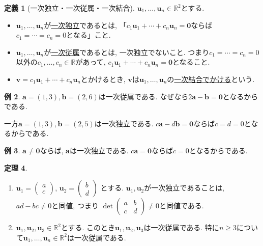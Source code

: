 \documentclass[dvipdfmx,a4paper,11pt]{article}
\newcommand{\R}{\mathbb{R}}
\theoremstyle{definition}
\newtheorem{thm}{定理}
\newtheorem{dfn}[thm]{定義}
\newtheorem{exa}[thm]{例}
\begin{document}
 
\begin{tcolorbox}[
    colback = white,
    colframe = green!35!black,
    fonttitle = \bfseries,
    breakable = true]
    \begin{dfn}[一次独立・一次従属・一次結合]
  $\bm{u}_1, \ldots, \bm{u}_n \in \R^2 $とする. 
    \begin{itemize}
	\setlength{\parskip}{0cm}
  	\setlength{\itemsep}{0pt} 
\item $\bm{u}_1, \ldots, \bm{u}_n $が\underline{一次独立}であるとは, 
「$c_1\bm{u}_1 + \cdots+ c_n\bm{u}_n = \bm{0}$ならば$c_1=\cdots =c_n =0$となる」こと.
\item $\bm{u}_1, \ldots, \bm{u}_n $が\underline{一次従属}であるとは, 
一次独立でないこと. つまり$c_1=\cdots =c_n =0$以外の$c_1, \ldots, c_n \in \R$があって, $c_1\bm{u}_1 + \cdots + c_n\bm{u}_n = \bm{0}$となること.
\item $\bm{v} = c_1\bm{u}_1 + \cdots + c_n\bm{u}_n $とかけるとき, $\bm{v}$は$\bm{u}_1, \ldots, \bm{u}_n$の\underline{一次結合でかける}という.
\end{itemize}
    \end{dfn}
 \end{tcolorbox}

 \begin{exa}
$\bm{a}=(1,3), \bm{b} = (2,6)$は一次従属である.
 なぜなら$2\bm{a} - \bm{b} =\bm{0}$となるからである.
 
 一方$\bm{a}=(1,3), \bm{b} = (2,5)$は一次独立である.
$c\bm{a} - d\bm{b} =\bm{0}$ならば$c=d=0$となるからである. 
\end{exa}

 \begin{exa}
$\bm{a}\neq \bm{0}$ならば, $\bm{a}$は一次独立である.
$c\bm{a} =\bm{0}$ならば$c=0$となるからである. 
\end{exa}


\begin{tcolorbox}[
    colback = white,
    colframe = green!35!black,
    fonttitle = \bfseries,
    breakable = true]
    \begin{thm}
    \begin{enumerate}
	\setlength{\parskip}{0cm}
  	\setlength{\itemsep}{0pt} 
\item $\bm{u}_1 =   
\begin{pmatrix}
a \\
 c
 \end{pmatrix} $, 
 $\bm{u}_2 =   
\begin{pmatrix}
b \\
 d
 \end{pmatrix} $
 とする. $\bm{u}_1, \bm{u}_2$が一次独立であることは, $ad-bc \neq 0$と同値, つまり
 $\det
 \begin{pmatrix}
a &b\\
 c&d
 \end{pmatrix} \neq 0$と同値である. 
 \item  $\bm{u}_1, \bm{u}_2, \bm{u}_3 \in \R^2 $とする. このとき$\bm{u}_1, \bm{u}_2, \bm{u}_3$は一次従属である. 特に$n \ge 3$について$\bm{u}_1, \ldots, \bm{u}_n \in \R^2 $は一次従属である. 
\end{enumerate}
    \end{thm}
 \end{tcolorbox}
\end{document}
